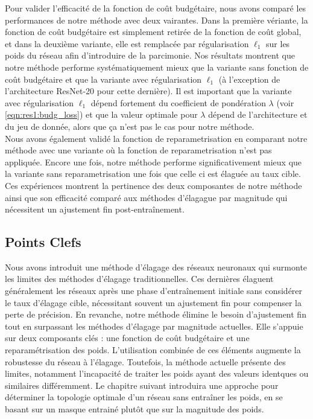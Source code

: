 Pour valider l'efficacité de la fonction de coût budgétaire, nous avons comparé
les performances de notre méthode avec deux vairantes. Dans la première
vériante, la fonction de coût budgétaire est simplement retirée de la fonction
de coût global, et dans la deuxième variante, elle est remplacée par
régularisation $\ell_1$ sur les poids du réseau afin d'introduire de la
parcimonie. Nos résultats montrent que notre méthode performe systématiquement
mieux que la variante sans fonction de coût budgétaire et que la variante avec
régularisation $\ell_1$ (à l'exception de l'architecture ResNet-20
\cite{DBLP:conf/cvpr/HeZRS16} pour cette dernière). Il est important que la
variante avec régularisation $\ell_1$ dépend fortement du coefficient de
pondération $\lambda$ (voir \cref{eqn:res1:budg_loss}) et que la valeur optimale
pour $\lambda$ dépend de l'architecture et du jeu de donnée, alors que ça n'est
pas le cas pour notre méthode.\\

Nous avons également validé la fonction de reparametrisation en comparant notre
méthode avec une variante où la fonction de reparametrisation n'est pas
appliquée. Encore une fois, notre méthode performe significativement mieux que
la variante sans reparametrisation une fois que celle ci est élaguée au taux
cible.\\

Ces expériences montrent la pertinence des deux composantes de notre méthode
ainsi que son efficacité comparé aux méthodes d'élagague par magnitude qui
nécessitent un ajustement fin post-entraînement.\\

\subsection*{Points Clefs}

Nous avons introduit une méthode d'élagage des réseaux neuronaux qui surmonte
les limites des méthodes d'élagage traditionnelles. Ces dernières élaguent
généralement les réseaux après une phase d'entraînement initiale sans considérer
le taux d'élagage cible, nécessitant souvent un ajustement fin pour compenser la
perte de précision. En revanche, notre méthode élimine le besoin d'ajustement
fin tout en surpassant les méthodes d'élagage par magnitude actuelles. Elle
s'appuie sur deux composants clés : une fonction de coût budgétaire et une
reparamétrisation des poids. L'utilisation combinée de ces éléments augmente la
robustesse du réseau à l'élagage. Toutefois, la méthode actuelle présente des
limites, notamment l'incapacité de traiter les poids ayant des valeurs identques
ou similaires différemment. Le chapitre suivant introduira une approche pour
déterminer la topologie optimale d'un réseau sans entraîner les poids, en se
basant sur un masque entrainé plutôt que sur la magnitude des poids.\\


